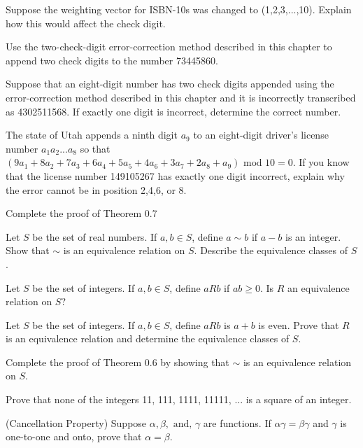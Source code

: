 \documentclass[11pt,largemargins]{homework}
\begin{document}
\question 
Suppose the weighting vector for ISBN-10s was changed to (1,2,3,...,10). Explain how this would affect the check digit.

\question 
Use the two-check-digit error-correction method described in this chapter to append two check digits to the 
number 73445860.

\question 
Suppose that an eight-digit number has two check digits appended using the error-correction method described in this chapter 
and it is incorrectly transcribed as 4302511568. If exactly one digit is incorrect, determine the correct number.

\question 
The state of Utah appends a ninth digit $a_9$ to an eight-digit driver's license number $a_1a_2...a_8$ so that 
$(9a_1+8a_2+7a_3+6a_4+5a_5+4a_6+3a_7+2a_8+a_9)\text{ mod } 10 =0$. If you know that the license number 149105267 has 
exactly one digit incorrect, explain why the error cannot be in position 2,4,6, or 8.

\question 
Complete the proof of Theorem 0.7

\question 
Let $S$ be the set of real numbers. If $a,b \in S$, define $a\sim b$ if $a-b$ is an integer. Show that $\sim$ is an 
equivalence relation on $S$. Describe the equivalence classes of $S$.

\question 
Let $S$ be the set of integers. If $a,b \in S$, define $aRb$ if $ab\geq 0$. Is $R$ an equivalence relation on $S$?

\question 
Let $S$ be the set of integers. If $a,b \in S$, define $aRb$ is $a+b$ is even. Prove that $R$ is an equivalence relation 
and determine the equivalence classes of $S$.

\question
Complete the proof of Theorem 0.6 by showing that $\sim$ is an equivalence relation on $S$.

\question 
Prove that none of the integers 11, 111, 1111, 11111, ... is a square of an integer.

\question 
(Cancellation Property) Suppose $\alpha, \beta, \text{ and, } \gamma$ are functions. If $\alpha\gamma=\beta\gamma$ and $\gamma$ 
is one-to-one and onto, prove that $\alpha=\beta$.
\end{document}
